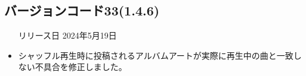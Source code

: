 \subsection*{バージョンコード33(1.4.6)}
\begin{itemize}
    \item[リリース日] 2024年5月19日
\end{itemize}

\new

\change

\fix
\begin{itemize}
    \item シャッフル再生時に投稿されるアルバムアートが実際に再生中の曲と一致しない不具合を修正しました。
\end{itemize}

